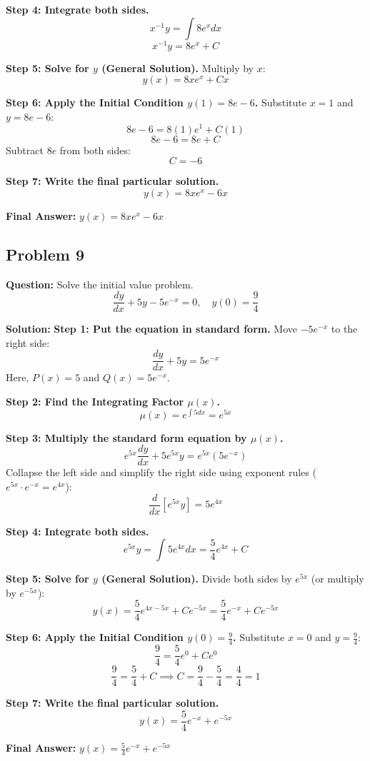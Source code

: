 \documentclass[11pt]{article}
\begin{document}
\textbf{Step 4: Integrate both sides.}
\[ x^{-1} y = \int 8e^x dx \]
\[ x^{-1} y = 8e^x + C \]

\textbf{Step 5: Solve for $y$ (General Solution).}
Multiply by $x$:
\[ y(x) = 8xe^x + Cx \]

\textbf{Step 6: Apply the Initial Condition $y(1) = 8e - 6$.}
Substitute $x = 1$ and $y = 8e - 6$:
\[ 8e - 6 = 8(1)e^1 + C(1) \]
\[ 8e - 6 = 8e + C \]
Subtract $8e$ from both sides:
\[ C = -6 \]

\textbf{Step 7: Write the final particular solution.}
\[ y(x) = 8xe^x - 6x \]

\textbf{Final Answer:} $y(x) = 8xe^x - 6x$

\hrulefill

\subsection*{Problem 9}
\textbf{Question:} Solve the initial value problem.
\[ \frac{dy}{dx} + 5y - 5e^{-x} = 0, \quad y(0) = \frac{9}{4} \]

\textbf{Solution:}
\textbf{Step 1: Put the equation in standard form.}
Move $-5e^{-x}$ to the right side:
\[ \frac{dy}{dx} + 5y = 5e^{-x} \]
Here, $P(x) = 5$ and $Q(x) = 5e^{-x}$.

\textbf{Step 2: Find the Integrating Factor $\mu(x)$.}
\[ \mu(x) = e^{\int 5 dx} = e^{5x} \]

\textbf{Step 3: Multiply the standard form equation by $\mu(x)$.}
\[ e^{5x} \frac{dy}{dx} + 5e^{5x} y = e^{5x}(5e^{-x}) \]
Collapse the left side and simplify the right side using exponent rules ($e^{5x} \cdot e^{-x} = e^{4x}$):
\[ \frac{d}{dx} \left[ e^{5x} y \right] = 5e^{4x} \]

\textbf{Step 4: Integrate both sides.}
\[ e^{5x} y = \int 5e^{4x} dx = \frac{5}{4}e^{4x} + C \]

\textbf{Step 5: Solve for $y$ (General Solution).}
Divide both sides by $e^{5x}$ (or multiply by $e^{-5x}$):
\[ y(x) = \frac{5}{4}e^{4x-5x} + Ce^{-5x} = \frac{5}{4}e^{-x} + Ce^{-5x} \]

\textbf{Step 6: Apply the Initial Condition $y(0) = \frac{9}{4}$.}
Substitute $x = 0$ and $y = \frac{9}{4}$:
\[ \frac{9}{4} = \frac{5}{4}e^0 + Ce^0 \]
\[ \frac{9}{4} = \frac{5}{4} + C \implies C = \frac{9}{4} - \frac{5}{4} = \frac{4}{4} = 1 \]

\textbf{Step 7: Write the final particular solution.}
\[ y(x) = \frac{5}{4}e^{-x} + e^{-5x} \]

\textbf{Final Answer:} $y(x) = \frac{5}{4}e^{-x} + e^{-5x}$
\end{document}

